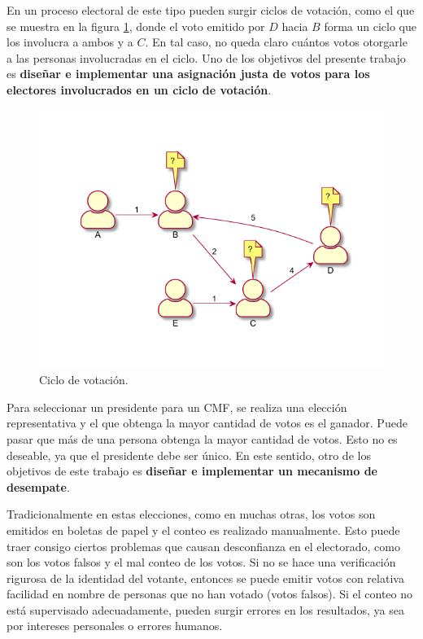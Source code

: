 En un proceso electoral de este tipo pueden surgir ciclos de votación, como el que se muestra en la figura \ref{fig:voting-cycle}, donde el voto emitido por $D$ hacia $B$ forma un ciclo que los involucra a ambos y a $C$. En tal caso, no queda claro cu\'antos votos otorgarle a las personas involucradas en el ciclo.  Uno de los objetivos del presente trabajo es \textbf{dise\~nar e implementar una asignaci\'on justa de  votos para los electores involucrados en un ciclo de votación}. 

\begin{figure}[h]
    \centering
    \includegraphics{Graphics/voting-cycle.pdf}
    \caption{Ciclo de votaci\'on.}
    \label{fig:voting-cycle}
\end{figure}

Para seleccionar un presidente para un CMF, se realiza una elecci\'on representativa y el que obtenga la mayor cantidad de votos es el ganador. Puede pasar que m\'as de una persona obtenga la mayor cantidad de votos.   Esto no es deseable, ya que el presidente debe ser \'unico. En este sentido, otro de los objetivos de este trabajo es \textbf{dise\~nar e implementar un mecanismo de desempate}.


Tradicionalmente en estas elecciones, como en muchas otras, los votos son emitidos en boletas de papel y el conteo es realizado manualmente. Esto puede traer consigo ciertos problemas que causan desconfianza en el electorado, como son los votos falsos y el mal conteo de los votos.   Si no se hace una verificaci\'on rigurosa de la identidad del votante, entonces se puede emitir votos con relativa facilidad en nombre de personas que no han votado (votos falsos). Si el conteo no est\'a supervisado adecuadamente, pueden surgir errores en los resultados, ya sea por intereses personales o errores humanos.

